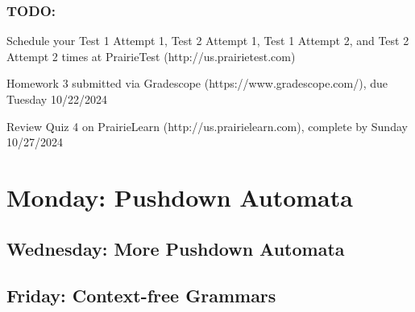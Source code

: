 \vspace{-20pt}

\subsubsection*{TODO:}
\begin{list}{\itemsep-10pt}
   \item Schedule your Test 1 Attempt 1, Test 2 Attempt 1, Test 1 Attempt 2, and Test 2 Attempt 2 times 
   at PrairieTest (http://us.prairietest.com)
   \item Homework 3 submitted via Gradescope (https://www.gradescope.com/), due Tuesday 10/22/2024
   \item Review Quiz 4 on PrairieLearn (http://us.prairielearn.com), complete by Sunday 10/27/2024
\end{list}

\newpage
\section*{Monday: Pushdown Automata}


    
\newpage
\subsection*{Wednesday: More Pushdown Automata}




\newpage
\subsection*{Friday: Context-free Grammars}



